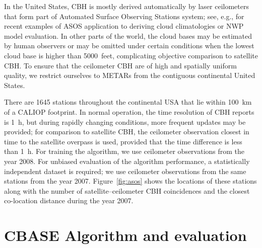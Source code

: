 \documentclass[essd,manuscript]{copernicus}\usepackage[]{graphicx}\usepackage[]{color}
\begin{document}
In the United States, CBH is mostly derived automatically by laser ceilometers
that form part of Automated Surface Observing Stations \citep[ASOS,][]{asos}
system; see, e.g., \cite{An2017,Ikeda2017} for recent examples of ASOS
application to deriving cloud climatologies or NWP model evaluation.  In other
parts of the world, the cloud bases may be estimated by human observers or may
be omitted under certain conditions when the lowest cloud base is higher than
5000~feet, complicating objective comparison to satellite CBH.  To ensure that
the ceilometer CBH are of high and spatially uniform quality, we restrict
ourselves to METARs from the contiguous continental United States.

There are 1645 %
stations throughout the continental USA that lie within 100~km of a CALIOP
footprint.  In normal operation, the time resolution of CBH reports is 1~h, but
during rapidly changing conditions, more frequent updates may be provided; for
comparison to satellite CBH, the ceilometer observation closest in time to the
satellite overpass is used, provided that the time difference is less than 1~h.
For training the algorithm, we use ceilometer observations from the year 2008.
For unbiased evaluation of the algorithm performance, a statistically
independent dataset is required; we use ceilometer observations from the same
stations from the year 2007.  Figure~\ref{fig:asos} shows the locations of these
stations along with the number of satellite--ceilometer CBH coincidences and the
closest co-location distance during the year 2007.

\section{CBASE Algorithm and evaluation}
\label{sec:algorithm}
\end{document}
